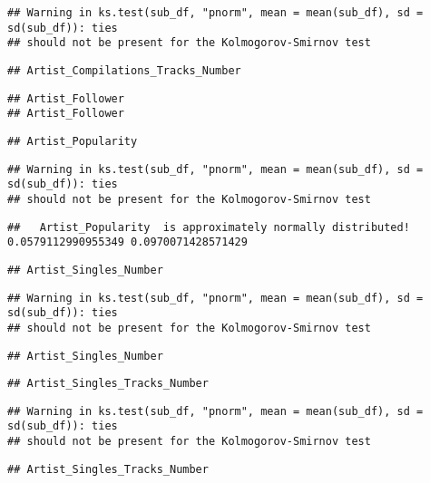 \documentclass[
]{article}
\begin{document}
\begin{verbatim}
## Warning in ks.test(sub_df, "pnorm", mean = mean(sub_df), sd = sd(sub_df)): ties
## should not be present for the Kolmogorov-Smirnov test
\end{verbatim}

\begin{verbatim}
## Artist_Compilations_Tracks_Number
\end{verbatim}

\begin{verbatim}
## Artist_Follower
## Artist_Follower
\end{verbatim}

\begin{verbatim}
## Artist_Popularity
\end{verbatim}

\begin{verbatim}
## Warning in ks.test(sub_df, "pnorm", mean = mean(sub_df), sd = sd(sub_df)): ties
## should not be present for the Kolmogorov-Smirnov test
\end{verbatim}

\begin{verbatim}
##   Artist_Popularity  is approximately normally distributed! 0.0579112990955349 0.0970071428571429
\end{verbatim}

\begin{verbatim}
## Artist_Singles_Number
\end{verbatim}

\begin{verbatim}
## Warning in ks.test(sub_df, "pnorm", mean = mean(sub_df), sd = sd(sub_df)): ties
## should not be present for the Kolmogorov-Smirnov test
\end{verbatim}

\begin{verbatim}
## Artist_Singles_Number
\end{verbatim}

\begin{verbatim}
## Artist_Singles_Tracks_Number
\end{verbatim}

\begin{verbatim}
## Warning in ks.test(sub_df, "pnorm", mean = mean(sub_df), sd = sd(sub_df)): ties
## should not be present for the Kolmogorov-Smirnov test
\end{verbatim}

\begin{verbatim}
## Artist_Singles_Tracks_Number
\end{verbatim}
\end{document}
